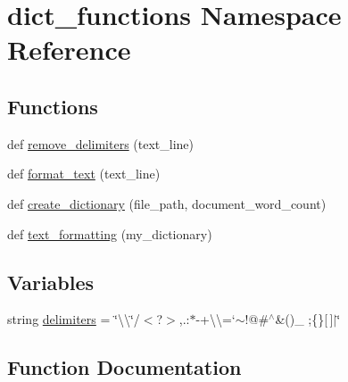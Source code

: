 \hypertarget{namespacedict__functions}{}\section{dict\+\_\+functions Namespace Reference}
\label{namespacedict__functions}
\subsection*{Functions}
\begin{DoxyCompactItemize}
\item 
def \hyperlink{namespacedict__functions_a49acb876cdee9d72c58256b23fbc15e5}{remove\+\_\+delimiters} (text\+\_\+line)
\item 
def \hyperlink{namespacedict__functions_adaacb8f2bf31cd2d1532598c788974c3}{format\+\_\+text} (text\+\_\+line)
\item 
def \hyperlink{namespacedict__functions_a31a6b118b13f4aa6066759aa4cf43959}{create\+\_\+dictionary} (file\+\_\+path, document\+\_\+word\+\_\+count)
\item 
def \hyperlink{namespacedict__functions_abb4baa4822ccfeb9ec8c59b7acb7ee3b}{text\+\_\+formatting} (my\+\_\+dictionary)
\end{DoxyCompactItemize}
\subsection*{Variables}
\begin{DoxyCompactItemize}
\item 
string \hyperlink{namespacedict__functions_a5b7d5eaf2a87a18bae901c297cd2f249}{delimiters} = \char`\"{}\textbackslash{}\textquotesingle{}\textbackslash{}\char`\"{}/$<$?$>$,.\+:$\ast$-\/+\textbackslash{}\textbackslash{}=`$\sim$!@\#$^\wedge$\&()\+\_\+ ;\{\}\mbox{[}$\,$\mbox{]}$\vert$\char`\"{}
\end{DoxyCompactItemize}


\subsection{Function Documentation}
